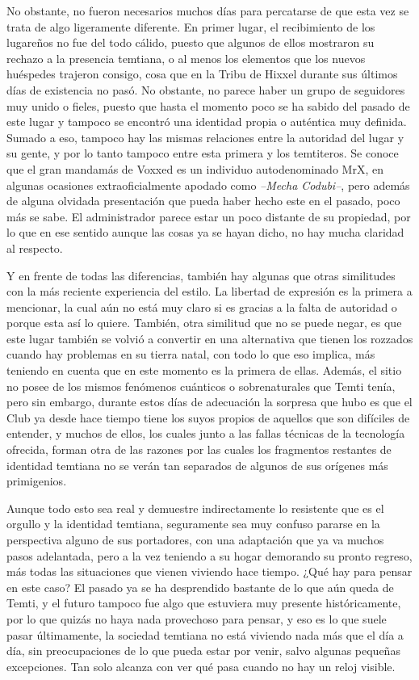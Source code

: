 \documentclass[
  spanish,
]{book}
\begin{document}
No obstante, no fueron necesarios muchos días para percatarse de que esta vez se trata de algo ligeramente diferente.
En primer lugar, el recibimiento de los lugareños no fue del todo cálido, puesto que algunos de ellos mostraron su rechazo a la presencia temtiana, o al menos los elementos que los nuevos huéspedes trajeron consigo, cosa que en la Tribu de Hixxel durante sus últimos días de existencia no pasó. No obstante, no parece haber un grupo de seguidores muy unido o fieles, puesto que hasta el momento poco se ha sabido del pasado de este lugar y tampoco se encontró una identidad propia o auténtica muy definida.
Sumado a eso, tampoco hay las mismas relaciones entre la autoridad del lugar y su gente, y por lo tanto tampoco entre esta primera y los temtiteros. Se conoce que el gran mandamás de Voxxed es un individuo autodenominado MrX, en algunas ocasiones extraoficialmente apodado como \emph{--Mecha Codubi--}, pero además de alguna olvidada presentación que pueda haber hecho este en el pasado, poco más se sabe. El administrador parece estar un poco distante de su propiedad, por lo que en ese sentido aunque las cosas ya se hayan dicho, no hay mucha claridad al respecto.

Y en frente de todas las diferencias, también hay algunas que otras similitudes con la más reciente experiencia del estilo.
La libertad de expresión es la primera a mencionar, la cual aún no está muy claro si es gracias a la falta de autoridad o porque esta así lo quiere. También, otra similitud que no se puede negar, es que este lugar también se volvió a convertir en una alternativa que tienen los rozzados cuando hay problemas en su tierra natal, con todo lo que eso implica, más teniendo en cuenta que en este momento es la primera de ellas.
Además, el sitio no posee de los mismos fenómenos cuánticos o sobrenaturales que Temti tenía, pero sin embargo, durante estos días de adecuación la sorpresa que hubo es que el Club ya desde hace tiempo tiene los suyos propios de aquellos que son difíciles de entender, y muchos de ellos, los cuales junto a las fallas técnicas de la tecnología ofrecida, forman otra de las razones por las cuales los fragmentos restantes de identidad temtiana no se verán tan separados de algunos de sus orígenes más primigenios.

Aunque todo esto sea real y demuestre indirectamente lo resistente que es el orgullo y la identidad temtiana, seguramente sea muy confuso pararse en la perspectiva alguno de sus portadores, con una adaptación que ya va muchos pasos adelantada, pero a la vez teniendo a su hogar demorando su pronto regreso, más todas las situaciones que vienen viviendo hace tiempo. ¿Qué hay para pensar en este caso?
El pasado ya se ha desprendido bastante de lo que aún queda de Temti, y el futuro tampoco fue algo que estuviera muy presente históricamente, por lo que quizás no haya nada provechoso para pensar, y eso es lo que suele pasar últimamente, la sociedad temtiana no está viviendo nada más que el día a día, sin preocupaciones de lo que pueda estar por venir, salvo algunas pequeñas excepciones. Tan solo alcanza con ver qué pasa cuando no hay un reloj visible.
\end{document}
